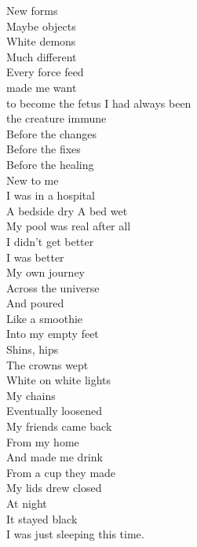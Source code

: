 New forms\\
Maybe objects\\
White demons\\
Much different\\

Every force feed\\
made me want\\
to become the fetus I had always been\\
the creature immune\\

Before the changes\\
Before the fixes\\
Before the healing\\
New to me\\

I was in a hospital\\
A bedside dry
A bed wet\\
My pool was real after all\\

I didn't get better\\
I was better\\
My own journey\\
Across the universe\\

And poured\\
Like a smoothie\\
Into my empty feet\\
Shins, hips\\

The crowns wept\\
White on white lights\\
My chains\\
Eventually loosened\\

My friends came back\\
From my home\\
And made me drink\\
From a cup they made\\

My lids drew closed\\
At night\\
It stayed black\\
I was just sleeping this time.\\

